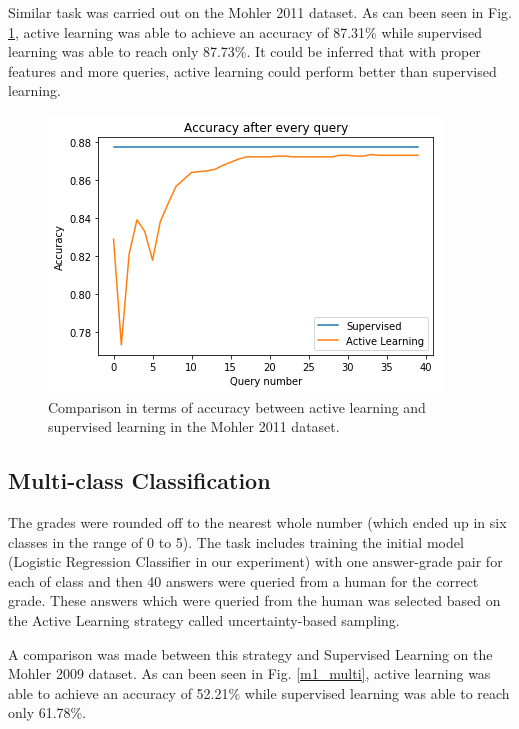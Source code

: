 Similar task was carried out on the Mohler 2011 dataset. As can been seen in Fig. \ref{m2_binary}, active learning was able to achieve an accuracy of 87.31\% while supervised learning was able to reach only 87.73\%. It could be inferred that with proper features and more queries, active learning could perform better than supervised learning.

\begin{figure}[h!]
	\centering
	\includegraphics[scale=0.7]{images/m2_binary}
	\caption{Comparison in terms of accuracy between active learning and supervised learning in the Mohler 2011 dataset.}
	\label{m2_binary}
\end{figure}


\subsection{Multi-class Classification}

The grades were rounded off to the nearest whole number (which ended up in six classes in the range of 0 to 5). The task includes training the initial model (Logistic Regression Classifier in our experiment) with one answer-grade pair for each of class  and then 40 answers were queried from a human for the correct grade. These answers which were queried from the human was selected based on the Active Learning strategy called uncertainty-based sampling. 

A comparison was made between this strategy and Supervised Learning on the Mohler 2009 dataset. As can been seen in Fig. \ref{m1_multi}, active learning was able to achieve an accuracy of 52.21\% while supervised learning was able to reach only 61.78\%.

